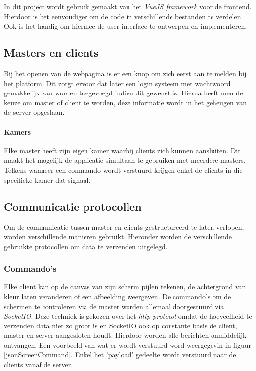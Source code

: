 In dit project wordt gebruik gemaakt van het \textit{VueJS framework} voor de frontend. Hierdoor is het eenvoudiger om de code in verschillende bestanden te verdelen. Ook is het handig om hiermee de user interface te ontwerpen en implementeren. 


\subsection{Masters en clients}
Bij het openen van de webpagina is er een knop om zich eerst aan te melden bij het platform.
Dit zorgt ervoor dat later een login systeem met wachtwoord gemakkelijk kan worden toegevoegd indien dit gewenst is.
Hierna heeft men de keuze om master of client te worden, deze informatie wordt in het geheugen van de server opgeslaan. 

\paragraph{Kamers} Elke master heeft zijn eigen kamer waarbij clients zich kunnen aansluiten. Dit maakt het mogelijk de applicatie simultaan te gebruiken met meerdere masters. Telkens wanneer een commando wordt verstuurd krijgen enkel de clients in die specifieke kamer dat signaal.

\subsection{Communicatie protocollen}
Om de communicatie tussen master en clients gestructureerd te laten verlopen, worden verschillende manieren gebruikt.
Hieronder worden de verschillende gebruikte protocollen om data te verzenden uitgelegd.
\subsubsection{Commando's}
Elke client kan op de canvas van zijn scherm pijlen tekenen, de achtergrond van kleur laten veranderen of een afbeelding weergeven. De commando's om de schermen te controleren via de master worden allemaal doorgestuurd via \textit{SocketIO}. Deze techniek is gekozen over het \textit{http-protocol} omdat de hoeveelheid te verzenden data niet zo groot is en SocketIO ook op constante basis de client, master en server aangesloten houdt. Hierdoor worden alle berichten onmiddelijk ontvangen. Een voorbeeld van wat er wordt verstuurd word weergegevin in figuur \ref{jsonScreenCommand}.
Enkel het 'payload' gedeelte wordt verstuurd naar de clients vanaf de server.

